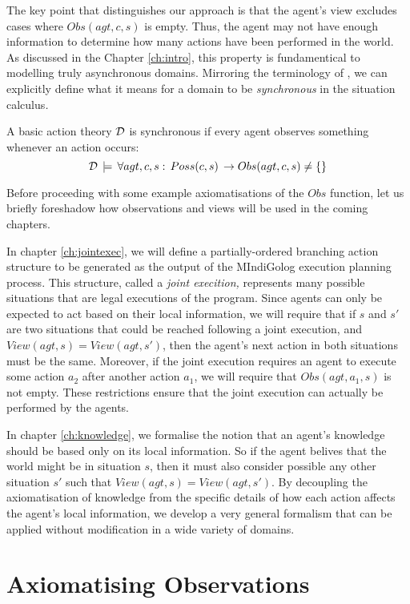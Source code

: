 The key point that distinguishes our approach is that the agent's
view excludes cases where $Obs(agt,c,s)$ is empty. Thus, the agent
may not have enough information to determine how many actions have
been performed in the world. As discussed in the Chapter \ref{ch:intro},
this property is fundamentical to modelling truly asynchronous domains.
Mirroring the terminology of \citep{vanBentham06tree_of_knowledge},
we can explicitly define what it means for a domain to be \emph{synchronous
}in the situation calculus\emph{.}

\begin{defnL}
 A basic action theory $\mathcal{D}$
is synchronous if every agent observes something whenever an action
occurs:\[
\mathcal{D}\,\models\,\forall agt,c,s:\, Poss(c,s)\,\rightarrow Obs(agt,c,s)\neq\{\}\]

\end{defnL}
Before proceeding with some example axiomatisations of the $Obs$
function, let us briefly foreshadow how observations and views will
be used in the coming chapters.

In chapter \ref{ch:jointexec}, we will define a partially-ordered
branching action structure to be generated as the output of the MIndiGolog
execution planning process. This structure, called a \emph{joint execition,
}represents many possible situations that are legal executions of
the program.\emph{ }Since agents can only be expected to act based
on their local information, we will require that if $s$ and $s'$
are two situations that could be reached following a joint execution,
and $View(agt,s)=View(agt,s')$, then the agent's next action in both
situations must be the same. Moreover, if the joint execution requires
an agent to execute some action $a_{2}$ after another action $a_{1}$,
we will require that $Obs(agt,a_{1},s)$ is not empty. These restrictions
ensure that the joint execution can actually be performed by the agents. 

In chapter \ref{ch:knowledge}, we formalise the notion that an agent's
knowledge should be based only on its local information. So if the
agent belives that the world might be in situation $s$, then it must
also consider possible any other situation $s'$ such that $View(agt,s)=View(agt,s')$.
By decoupling the axiomatisation of knowledge from the specific details
of how each action affects the agent's local information, we develop
a very general formalism that can be applied without modification
in a wide variety of domains.


\section{Axiomatising Observations\label{sec:Observations:Axiomatising-simple}}

